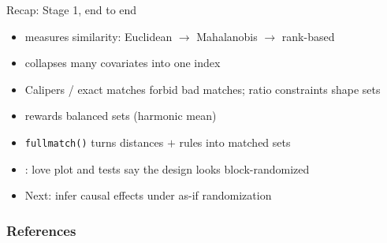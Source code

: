 \documentclass[table, xcolor = {dvipsnames}, 9pt]{beamer}
\theoremstyle{plain}
\newcommand{\mh}[1]{{\color{magenta}{#1}}}
\begin{document}
\begin{frame}[t]{Recap: Stage 1, end to end}
\vfill
\begin{itemize} \vfill
\item \mh{Distance} measures similarity: Euclidean $\to$ Mahalanobis $\to$ rank-based \vfill
\item \mh{Propensity score} collapses many covariates into one index \vfill
\item Calipers / exact matches forbid bad matches; ratio constraints shape sets \vfill
\item \mh{Effective sample size} rewards balanced sets (harmonic mean) \vfill
\item \texttt{fullmatch()} turns distances $+$ rules into matched sets \vfill
\item \mh{Balance}: love plot and tests say the design looks block-randomized \vfill
\item Next: infer causal effects under as-if randomization \vfill
\end{itemize} \vfill
\end{frame}
\begin{frame}[allowframebreaks]
\frametitle{References}
\scriptsize


\end{frame}
\end{document}
